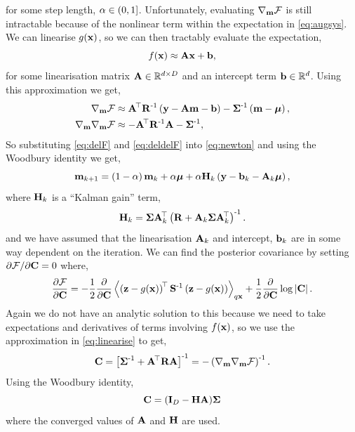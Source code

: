 \documentclass{article} %
\begin{document}
for some step length, $\step \in (0, 1]$. Unfortunately, evaluating
$\nabla_\pomean\Fengy$ is still intractable because of the nonlinear term
within the expectation in \eqref{eq:augsys}. We can linearise
$\augnonlin{\lstate}$, so we can then tractably evaluate the expectation,
\begin{equation}
    \nonlin{\lstate} \approx \Linmat\lstate + \intcpt,
    \label{eq:linearise}
\end{equation}
for some linearisation matrix $\Linmat \in \real{d \times D}$ and an intercept
term $\intcpt \in \real{d}$. Using this approximation we get,
\begin{align}
    \nabla_\pomean \Fengy
        &\approx \Linmat\transpose\lcov\inv\brac{\obs - \Linmat\pomean 
            - \intcpt} - \prcov\inv\brac{\pomean - \prmean}, 
        \label{eq:delF} \\
    \nabla_\pomean \nabla_\pomean \Fengy
        &\approx - \Linmat\transpose\lcov\inv\Linmat - \prcov\inv,
        \label{eq:deldelF}
\end{align}
So substituting \eqref{eq:delF} and \eqref{eq:deldelF} into \eqref{eq:newton}
and using the Woodbury identity we get,
\begin{equation}
    \pomean_{k+1} = \brac{1-\step}\pomean_k + \step\prmean 
        + \step\Kgain_k\brac{\obs - \intcpt_k - \Linmat_k\prmean},
    \label{eq:pomean}
\end{equation}
where $\Kgain_k$ is a ``Kalman gain'' term,
\begin{equation}
    \Kgain_k = \prcov\Linmat_k\transpose\brac{\lcov +
        \Linmat_k\prcov\Linmat_k\transpose}\inv.
\end{equation}
and we have assumed that the linearisation $\Linmat_k$ and intercept,
$\intcpt_k$ are in some way dependent on the iteration. We can find the 
posterior covariance by setting $\partial\Fengy/\partial\pocov = 0$ where,
\begin{equation}
    \frac{\partial\Fengy}{\partial\pocov} = -\frac{1}{2} 
        \frac{\partial}{\partial\pocov}
        \expec{q\lstate}{
            \brac{\augobs - \augnonlin{\lstate}}\transpose\augcov\inv
            \brac{\augobs - \augnonlin{\lstate}}
    } 
    + \frac{1}{2} \frac{\partial}{\partial\pocov} \log \deter{\pocov}.
\end{equation}
Again we do not have an analytic solution to this because we need to take
expectations and derivatives of terms involving $\nonlin{\lstate}$, so we use
the approximation in \eqref{eq:linearise} to get,
\begin{equation}
    \pocov = \sbrac{\prcov\inv + \Linmat\transpose\lcov\Linmat}\inv
    = - \brac{\nabla_\pomean \nabla_\pomean \Fengy}\inv.
\end{equation}
Using the Woodbury identity,
\begin{equation}
    \pocov = \brac{\ident{D} - \Kgain\Linmat}\!\prcov
    \label{eq:pocov}
\end{equation}
where the converged values of $\Linmat$ and $\Kgain$ are used.
\end{document}
